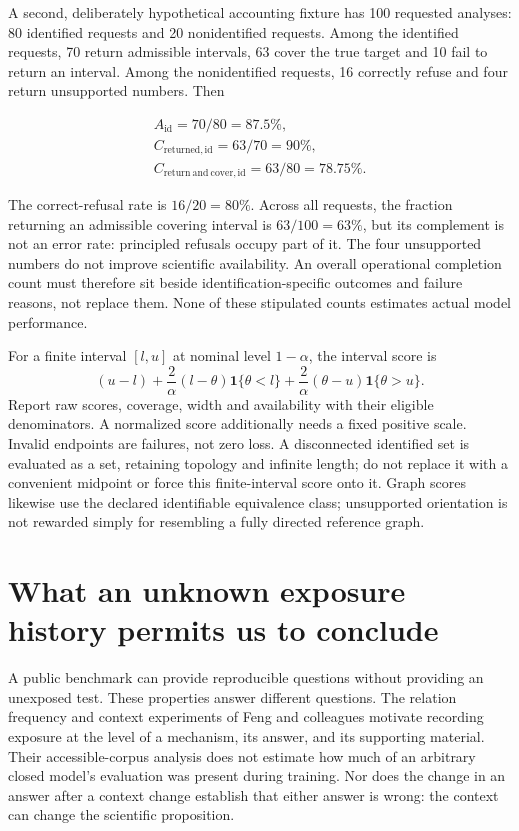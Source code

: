 A second, deliberately hypothetical accounting fixture has 100 requested
analyses: 80 identified requests and 20 nonidentified requests. Among
the identified requests, 70 return admissible intervals, 63 cover the
true target and 10 fail to return an interval. Among the nonidentified
requests, 16 correctly refuse and four return unsupported numbers. Then

\[
 \begin{gathered}
 A_{\mathrm{id}}=70/80=87.5\%,\\
 C_{\mathrm{returned,id}}=63/70=90\%,\\
 C_{\mathrm{return\ and\ cover,id}}=63/80=78.75\%.
\end{gathered}
\]

The correct-refusal rate is \(16/20=80\%\). Across all requests, the
fraction returning an admissible covering interval is \(63/100=63\%\),
but its complement is not an error rate: principled refusals occupy part
of it. The four unsupported numbers do not improve scientific
availability. An overall operational completion count must therefore sit
beside identification-specific outcomes and failure reasons, not replace
them. None of these stipulated counts estimates actual model
performance.~\citep{exec14_evaluation_oracle}

For a finite interval \([l,u]\) at nominal level \(1-\alpha\), the
interval score is \[
 (u-l)+\frac{2}{\alpha}(l-\theta)\mathbf1\{\theta<l\}
       +\frac{2}{\alpha}(\theta-u)\mathbf1\{\theta>u\}.
\] Report raw scores, coverage, width and availability with their
eligible denominators. A normalized score additionally needs a fixed
positive scale. Invalid endpoints are failures, not zero loss. A
disconnected identified set is evaluated as a set, retaining topology
and infinite length; do not replace it with a convenient midpoint or
force this finite-interval score onto it. Graph scores likewise use the
declared identifiable equivalence class; unsupported orientation is not
rewarded simply for resembling a fully directed reference graph.


\section{What an unknown exposure history permits us to conclude}
\label{exec14:l7-development}

A public benchmark can provide reproducible questions without providing an
unexposed test. These properties answer different questions. The relation
frequency and context experiments of Feng and colleagues motivate recording
exposure at the level of a mechanism, its answer, and its supporting material.
Their accessible-corpus analysis does not estimate how much of an arbitrary
closed model's evaluation was present during training. Nor does the change in
an answer after a context change establish that either answer is wrong: the
context can change the scientific proposition.
\citep{v12_la_2407_19638,exec14_l7_exposure_audit}

